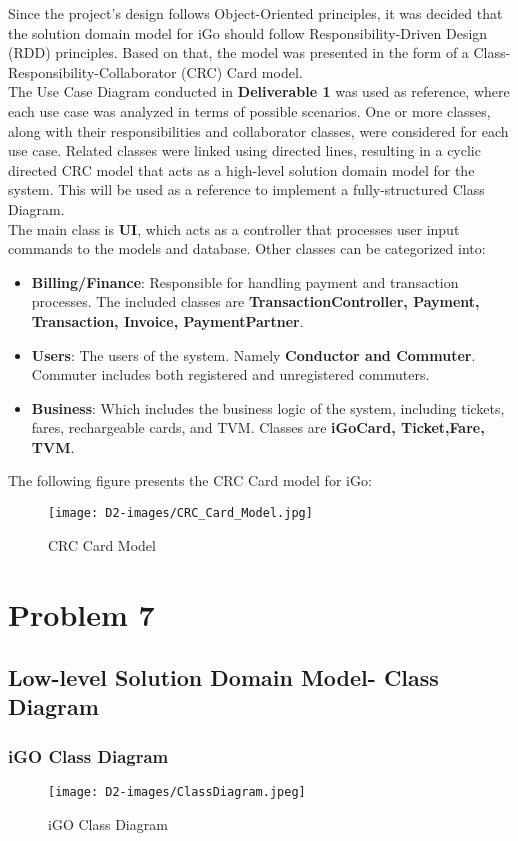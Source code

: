 \documentclass[a4paper,12pt]{report}
\begin{document}
Since the project’s design follows Object-Oriented principles, it was decided that the solution domain model for iGo should follow Responsibility-Driven Design (RDD) principles. Based on that, the model was presented in the form of a Class-Responsibility-Collaborator (CRC) Card model.\\
The Use Case Diagram conducted in \textbf{Deliverable 1} was used as reference, where each use case was analyzed in terms of possible scenarios. One or more classes, along with their responsibilities and collaborator classes, were considered for each use case. Related classes were linked using directed lines, resulting in a cyclic directed CRC model that acts as a high-level solution domain model for the system. This will be used as a reference to implement a fully-structured Class Diagram.\\
 The main class is \textbf{UI}, which acts as a controller that processes user input commands to the models and database. Other classes can be categorized into:
\begin{itemize}
  \item \textbf{Billing/Finance}: Responsible for handling payment and transaction processes. The included classes are \textbf{TransactionController, Payment, Transaction, Invoice, PaymentPartner}.
  \item \textbf{Users}: The users of the system. Namely \textbf{Conductor and Commuter}. Commuter includes both registered and unregistered commuters.
  \item \textbf{Business}: Which includes the business logic of the system, including tickets, fares, rechargeable cards, and TVM. Classes are \textbf{iGoCard,  Ticket,Fare, TVM}.
\end{itemize}
The following figure presents the CRC Card model for iGo:

\begin{figure}[h!]
  \centering
    \texttt{[image: D2-images/CRC\_Card\_Model.jpg]}
  \caption{CRC Card Model}
\end{figure}
\chapter{Problem 7}
\section{Low-level Solution Domain Model- Class Diagram}
\subsection{iGO Class Diagram}
\begin{figure}[h!]
  \centering
   \texttt{[image: D2-images/ClassDiagram.jpeg]}
  \caption{iGO Class Diagram}
\end{figure}
\end{document}
